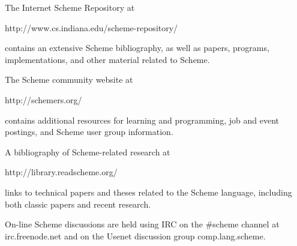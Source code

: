 
The Internet Scheme Repository at
\begin{center}
{\cf http://www.cs.indiana.edu/scheme-repository/}
\end{center}
contains an extensive Scheme bibliography, as well as papers,
programs, implementations, and other material related to Scheme.

The Scheme community website at
\begin{center}
{\cf http://schemers.org/}
\end{center}
contains additional resources for learning and programming, job and
event postings, and Scheme user group information.

A bibliography of Scheme-related research at
\begin{center}
{\cf http://library.readscheme.org/}
\end{center}
links to technical papers and theses related to the Scheme language,
including both classic papers and recent research.

On-line Scheme discussions are held using IRC
on the {\cf \#scheme} channel at {\cf irc.freenode.net}
and on the Usenet discussion group {\cf comp.lang.scheme}.
